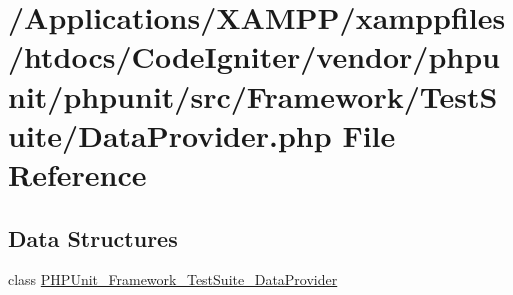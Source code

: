 \hypertarget{_data_provider_8php}{}\section{/\+Applications/\+X\+A\+M\+P\+P/xamppfiles/htdocs/\+Code\+Igniter/vendor/phpunit/phpunit/src/\+Framework/\+Test\+Suite/\+Data\+Provider.php File Reference}
\label{_data_provider_8php}
\subsection*{Data Structures}
\begin{DoxyCompactItemize}
\item 
class \mbox{\hyperlink{class_p_h_p_unit___framework___test_suite___data_provider}{P\+H\+P\+Unit\+\_\+\+Framework\+\_\+\+Test\+Suite\+\_\+\+Data\+Provider}}
\end{DoxyCompactItemize}
